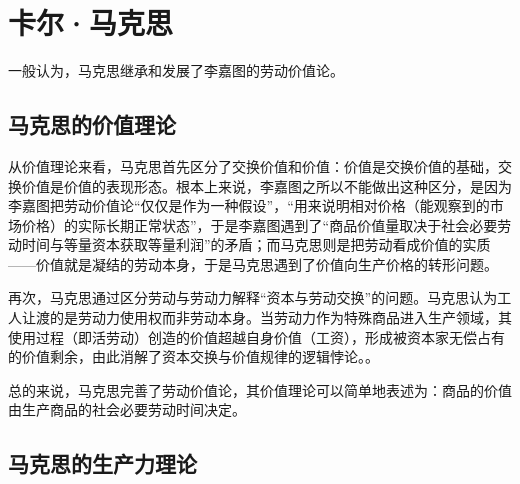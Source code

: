 \section{卡尔·马克思}

一般认为，马克思继承和发展了李嘉图的劳动价值论\cite[347]{YueSeFu*XiongBiTeJingJiFenXiShiDi2Juan2017}\cite[84]{ChenDaiSunCongGuDianJingJiXuePaiDaoMaKeSiRuoGanZhuYaoXueShuoFaZhanLueLun2014}。

\subsection{马克思的价值理论}

从价值理论来看，马克思首先区分了交换价值和价值：价值是交换价值的基础，交换价值是价值的表现形态\cite[86-88]{ChenDaiSunCongGuDianJingJiXuePaiDaoMaKeSiRuoGanZhuYaoXueShuoFaZhanLueLun2014}。根本上来说，李嘉图之所以不能做出这种区分，是因为李嘉图把劳动价值论“仅仅是作为一种假设”，“用来说明相对价格（能观察到的市场价格）的实际长期正常状态”\cite[348]{YueSeFu*XiongBiTeJingJiFenXiShiDi2Juan2017}，于是李嘉图遇到了“商品价值量取决于社会必要劳动时间与等量资本获取等量利润”的矛盾\cite[144]{CaiJiMingCongGuDianZhengZhiJingJiXueDaoZhongGuoTeSeSheHuiZhuYiZhengZhiJingJiXueJiYuZhongGuoShiJiaoDeZhengZhiJingJiXueYanBianShangCe2023}\cite[21-28]{DaWei*LiJiaTuZhengZhiJingJiXueJiFuShuiYuanLi2021}；而马克思则是把劳动看成价值的实质——价值就是凝结的劳动本身，于是马克思遇到了价值向生产价格的转形问题\cite[348-350]{YueSeFu*XiongBiTeJingJiFenXiShiDi2Juan2017}\cite[159]{CaiJiMingCongGuDianZhengZhiJingJiXueDaoZhongGuoTeSeSheHuiZhuYiZhengZhiJingJiXueJiYuZhongGuoShiJiaoDeZhengZhiJingJiXueYanBianShangCe2023}。

再次，马克思通过区分劳动与劳动力解释“资本与劳动交换”的问题。马克思认为工人让渡的是劳动力使用权而非劳动本身。当劳动力作为特殊商品进入生产领域，其使用过程（即活劳动）创造的价值超越自身价值（工资），形成被资本家无偿占有的价值剩余，由此消解了资本交换与价值规律的逻辑悖论。\cite[615,581-606]{ZhongGongZhongYangMaKeSiEnGeSiLieNingSiDaLinZhuZuoBianYiJuMaKeSiEnGeSiWenJiDi5Juan2009}\cite[157-158]{CaiJiMingCongGuDianZhengZhiJingJiXueDaoZhongGuoTeSeSheHuiZhuYiZhengZhiJingJiXueJiYuZhongGuoShiJiaoDeZhengZhiJingJiXueYanBianShangCe2023}\cite[348]{YueSeFu*XiongBiTeJingJiFenXiShiDi2Juan2017}。

总的来说，马克思完善了劳动价值论，其价值理论可以简单地表述为：商品的价值由生产商品的社会必要劳动时间决定\cite[51-52]{ZhongGongZhongYangMaKeSiEnGeSiLieNingSiDaLinZhuZuoBianYiJuMaKeSiEnGeSiWenJiDi5Juan2009}。

\subsection{马克思的生产力理论}

